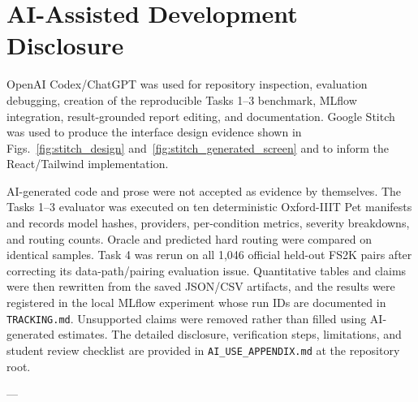 \documentclass[journal,compsoc]{IEEEtran}
\begin{document}
\appendices
\section{AI-Assisted Development Disclosure}
OpenAI Codex/ChatGPT was used for repository inspection, evaluation debugging,
creation of the reproducible Tasks 1--3 benchmark, MLflow integration,
result-grounded report editing, and documentation. Google Stitch was used to
produce the interface design evidence shown in
Figs.~\ref{fig:stitch_design} and~\ref{fig:stitch_generated_screen} and to
inform the React/Tailwind implementation.

AI-generated code and prose were not accepted as evidence by themselves. The
Tasks 1--3 evaluator was executed on ten deterministic Oxford-IIIT Pet
manifests and records model hashes, providers, per-condition metrics, severity
breakdowns, and routing counts. Oracle and predicted hard routing were compared
on identical samples. Task 4 was rerun on all 1,046 official held-out FS2K
pairs after correcting its data-path/pairing evaluation issue. Quantitative
tables and claims were then rewritten from the saved JSON/CSV artifacts, and
the results were registered in the local MLflow experiment whose run IDs are
documented in \texttt{TRACKING.md}. Unsupported claims were removed rather than
filled using AI-generated estimates. The detailed disclosure, verification
steps, limitations, and student review checklist are provided in
\texttt{AI\_USE\_APPENDIX.md} at the repository root.

---



\end{document}
